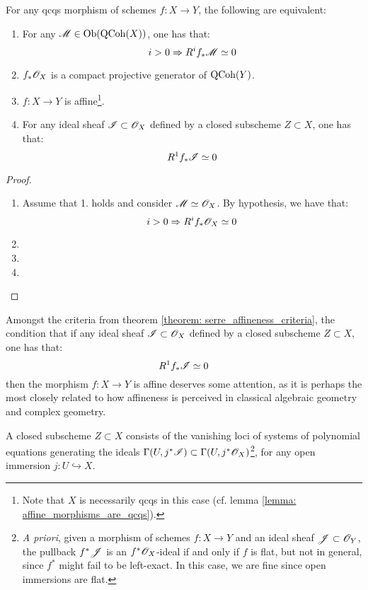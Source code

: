        \begin{theorem} \label{theorem: serre_affineness_criteria}
            For any qcqs morphism of schemes $f: X \to Y$, the following are equivalent:
            \begin{enumerate}
                \item For any $\mathscr{M} \in \mathrm{Ob}(\mathrm{QCoh}(X))$, one has that:
                    $$i > 0 \Rightarrow R^i f_*\mathscr{M} \simeq 0$$
                \item $f_*\mathscr{O}_X$ is a compact projective generator of $\mathrm{QCoh}(Y)$. 
                \item $f: X \to Y$ is affine\footnote{Note that $X$ is necessarily qcqs in this case (cf. lemma \ref{lemma: affine_morphisms_are_qcqs}).}.
                \item For any ideal sheaf $\mathscr{I} \subset \mathscr{O}_X$ defined by a closed subscheme $Z \subset X$, one has that:
                    $$R^1 f_*\mathscr{I} \simeq 0$$
            \end{enumerate}
        \end{theorem}
            \begin{proof}
                \begin{enumerate}
                    \item Assume that 1. holds and consider $\mathscr{M} \simeq \mathscr{O}_X$. By hypothesis, we have that:
                        $$i > 0 \Rightarrow R^i f_*\mathscr{O}_X \simeq 0$$
                    \item 
                    \item 
                    \item 
                \end{enumerate}
            \end{proof}
        \begin{remark}
            Amongst the criteria from theorem \ref{theorem: serre_affineness_criteria}, the condition that if any ideal sheaf $\mathscr{I} \subset \mathscr{O}_X$ defined by a closed subscheme $Z \subset X$, one has that:
                $$R^1 f_*\mathscr{I} \simeq 0$$
            then the morphism $f: X \to Y$ is affine deserves some attention, as it is perhaps the most closely related to how affineness is perceived in classical algebraic geometry and complex geometry. 

            A closed subscheme $Z \subset X$ consists of the vanishing loci of systems of polynomial equations generating the ideals $\Gamma(U, j^*\mathscr{I}) \subset \Gamma(U, j^*\mathscr{O}_X)$\footnote{\textit{A priori}, given a morphism of schemes $f: X \to Y$ and an ideal sheaf $\mathscr{J} \subset \mathscr{O}_Y$, the pullback $f^*\mathscr{J}$ is an $f^*\mathscr{O}_X$-ideal if and only if $f$ is flat, but not in general, since $f^*$ might fail to be left-exact. In this case, we are fine since open immersions are flat.}, for any open immersion $j: U \hookrightarrow X$. 
        \end{remark}

